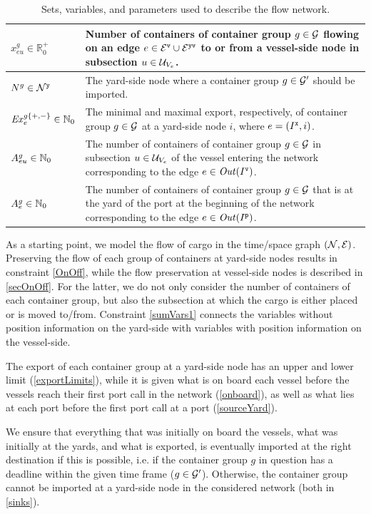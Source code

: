 \begin{table}
\begin{tabular}{lp{10cm}}
$x^{g}_{eu}\in\mathbb{R}^+_0$	&	Number of containers of container group $g\in\mathcal{G}$ flowing on an edge $e\in\mathcal{E}^\texttt{v}\cup\mathcal{E}^\texttt{yv}$ to or from a vessel-side node in subsection $u\in \mathcal{U}_{V_e}$.\\
\hline
$N^g\in\mathcal{N}^\texttt{y}$		 		& The yard-side node where a container group $g\in \mathcal{G}'$ should be imported.\\
$\mathit{Ex}^{g\{+,-\}}_e\in\mathbb{N}_0$	
															& The minimal and maximal export, respectively, of container group $g\in \mathcal{G}$ at a yard-side node $i$, where $e=(I^\texttt{x},i)$.\\
$A^{g}_{eu}\in \mathbb{N}_0$			& The number of containers of container group $g\in\mathcal{G}$ in subsection $u\in \mathcal{U}_{V_e}$ of the vessel entering the network corresponding to the edge $e\in\mathit{Out}(I^\texttt{v})$.\\
$A^g_e\in \mathbb{N}_0$						& The number of containers of container group $g\in \mathcal{G}$ that is at the yard of the port at the beginning of the network corresponding to the edge $e\in\mathit{Out}(I^\texttt{p})$.\\
\end{tabular}
\etsize
\caption{Sets, variables, and parameters used to describe the flow network.}\label{tab:net}
\end{table}

As a starting point, we model the flow of cargo in the time/space graph $(\mathcal{N},\mathcal{E})$. Preserving the flow of each group of containers at yard-side nodes results in constraint \eqref{OnOff}, while the flow preservation at vessel-side nodes is described in \eqref{secOnOff}. 
For the latter, we do not only consider the number of containers of each container group, but also the subsection at which the cargo is either placed or is moved to/from. Constraint \eqref{sumVars1} connects the variables without position information on the yard-side with variables with position information on the vessel-side. 

The export of each container group at a yard-side node has an upper and lower limit (\ref{exportLimits}), while it is given what is on board each vessel before the vessels reach their first port call in the network (\ref{onboard}), as well as what lies at each port before the first port call at a port (\ref{sourceYard}).

We ensure that everything that was initially on board the vessels, what was initially at the yards, and what is exported, is eventually imported at the right destination if this is possible, i.e. if the container group $g$ in question has a deadline within the given time frame ($g\in\mathcal{G}'$). Otherwise, the container group cannot be imported at a yard-side node in the considered network (both in \eqref{sinks}).  

